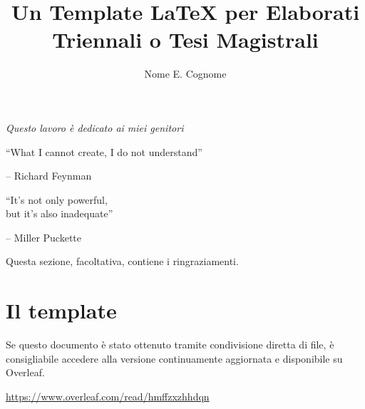 \documentclass[12pt]{report}
\title{Un Template LaTeX per Elaborati Triennali o Tesi Magistrali}
\author{Nome E. Cognome}
\begin{document}
    \makefrontpage

%
%

    {\raggedleft \large \sl Questo lavoro \`{e} dedicato ai miei genitori\\

    \vspace{2cm}

    ``What I cannot create, I do not understand''

    \bigskip

    \--- Richard Feynman\\

    \vspace{2cm}

    ``It's not only powerful,\\but it's also inadequate''

    \bigskip

    \--- Miller Puckette\\}

    \clearpage
    \beforepreface

%
%


%
%

    Questa sezione, facoltativa, contiene i ringraziamenti.

%
%

    \afterpreface

%
%

    

    \section{Il template}
    Se questo documento è stato ottenuto tramite condivisione diretta di file, è consigliabile accedere alla versione continuamente aggiornata e disponibile su Overleaf. \begin{center}
                                                                                                                                                                              \url{https://www.overleaf.com/read/hmffzxzhhdqn}
    \end{center}
\end{document}

